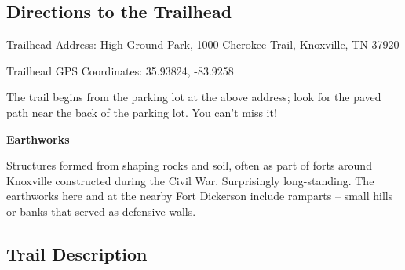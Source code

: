 \documentclass[
  letterpaper,
  DIV=11,
  numbers=noendperiod]{scrreprt}
\begin{document}
\subsection{Directions to the
Trailhead}\label{directions-to-the-trailhead-3}

Trailhead Address: High Ground Park, 1000 Cherokee Trail, Knoxville, TN
37920

Trailhead GPS Coordinates: 35.93824, -83.9258

The trail begins from the parking lot at the above address; look for the
paved path near the back of the parking lot. You can't miss it!

\begin{tcolorbox}[enhanced jigsaw, arc=.35mm, leftrule=.75mm, opacityback=0, breakable, rightrule=.15mm, toprule=.15mm, colframe=quarto-callout-note-color-frame, colback=white, bottomrule=.15mm, left=2mm]
\begin{minipage}[t]{5.5mm}
\textcolor{quarto-callout-note-color}{\faInfo}
\end{minipage}%
\begin{minipage}[t]{\textwidth - 5.5mm}

\vspace{-3mm}\textbf{Earthworks}\vspace{3mm}

Structures formed from shaping rocks and soil, often as part of forts
around Knoxville constructed during the Civil War. Surprisingly
long-standing. The earthworks here and at the nearby Fort Dickerson
include ramparts -- small hills or banks that served as defensive walls.

\end{minipage}%
\end{tcolorbox}

\subsection{Trail Description}\label{trail-description-3}
\end{document}
